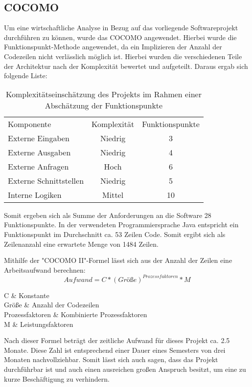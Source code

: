 {	\subsection{COCOMO}
	Um eine wirtschaftliche Analyse in Bezug auf das vorliegende Softwareprojekt durchführen zu können, wurde das COCOMO angewendet. Hierbei wurde die Funktionspunkt-Methode angewendet, da ein Implizieren der Anzahl der Codezeilen nicht verlässlich möglich ist. Hierbei wurden die verschiedenen Teile der Architektur nach der Komplexität bewertet und aufgeteilt. Daraus ergab sich folgende Liste:
	\begin{table}[H]
		\footnotesize
	\begin{tabular}{lcc}
		Komponente & Komplexität & Funktionspunkte \\
		Externe Eingaben & Niedrig & 3 \\
		Externe Ausgaben & Niedrig & 4 \\
		Externe Anfragen & Hoch & 6 \\
		Externe Schnittstellen & Niedrig & 5\\
		Interne Logiken & Mittel & 10\\
	\end{tabular}
	\caption{Komplexitätseinschätzung des Projekts im Rahmen einer Abschätzung der Funktionspunkte}
	\end{table}
	Somit ergeben sich als Summe der Anforderungen an die Software 28 Funktionspunkte. In der verwendeten Programmiersprache Java entspricht ein Funktionspunkt im Durchschnitt ca. 53 Zeilen Code. Somit ergibt sich als Zeilenanzahl eine erwartete Menge von 1484 Zeilen.
	
	Mithilfe der "COCOMO II"-Formel lässt sich aus der Anzahl der Zeilen eine Arbeitsaufwand berechnen:
	\begin{equation}\label{cocomo}
	Aufwand = C * (Größe)^{Prozessfaktoren} * M
	\end{equation}
	\begin{conditions*}
		C & Konstante\\
		Größe & Anzahl der Codezeilen\\
		Prozessfaktoren & Kombinierte Prozessfaktoren\\
		M & Leistungsfaktoren\\
	\end{conditions*}

	Nach dieser Formel beträgt der zeitliche Aufwand für dieses Projekt ca. 2.5 Monate. Diese Zahl ist entsprechend einer Dauer eines Semesters von drei Monaten nachvollziehbar. Somit lässt sich auch sagen, dass das Projekt durchführbar ist und auch einen ausreichen großen Anspruch besitzt, um eine zu kurze Beschäftigung zu verhindern.
}